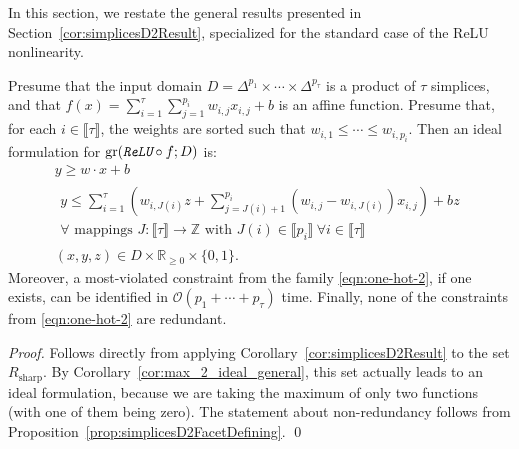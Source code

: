 \documentclass[smallextended]{svjour3}
\newcommand{\bbR}{\mathbb{R}}
\newcommand{\gr}{\operatorname{gr}}
\newcommand{\ReLu}{\texttt{ReLU}}
\newcommand{\Rsharp}{R_{\operatorname{sharp}}}
\begin{document}
In this section, we restate the general results presented in Section~\ref{cor:simplicesD2Result}, specialized for the standard case of the ReLU nonlinearity.

\begin{corollary} \label{cor:simplicesD2ReLU}
    Presume that the input domain $D = \Delta^{p_1} \times \cdots \times \Delta^{p_\tau}$ is a product of $\tau$ simplices, and that $f(x) = \sum_{i=1}^\tau \sum_{j=1}^{p_i} w_{i,j} x_{i,j} + b$ is an affine function. Presume that, for each $i \in \llbracket \tau \rrbracket$, the weights are sorted such that $w_{i,1} \leq \cdots \leq w_{i,p_i}$. Then an ideal formulation for $\gr(\emph{\ReLu{}} \circ f; D)$ is:
    \begin{subequations}
    \begin{gather}
        y \geq w \cdot x + b \\
        \begin{aligned}
        y \leq \sum_{i=1}^\tau \left( w_{i,J(i)} z + \sum_{j=J(i)+1}^{p_i} (w_{i,j} - w_{i,J(i)})x_{i,j} \right) + bz  \\
        \forall\text{ mappings $J:\llbracket\tau\rrbracket\to\mathbb{Z}$ with $J(i)\in\llbracket p_i\rrbracket\ \forall i\in\llbracket\tau\rrbracket$} \end{aligned}\label{eqn:one-hot-2} \\
        (x,y,z) \in D \times \bbR_{\geq 0} \times \{0,1\}.
    \end{gather}
    \end{subequations}
    Moreover, a most-violated constraint from the family \eqref{eqn:one-hot-2}, if one exists, can be identified in $\mathcal{O}(p_1+\cdots+p_\tau)$ time. Finally, none of the constraints from \eqref{eqn:one-hot-2} are redundant.
\end{corollary}

\begin{proof}
Follows directly from applying Corollary~\ref{cor:simplicesD2Result} to the set $\Rsharp$.
By Corollary~\ref{cor:max_2_ideal_general}, this set actually leads to an ideal formulation, because we are taking the maximum of only two functions (with one of them being zero).  The statement about non-redundancy follows from Proposition~\ref{prop:simplicesD2FacetDefining}.
\qed\end{proof}
\end{document}

